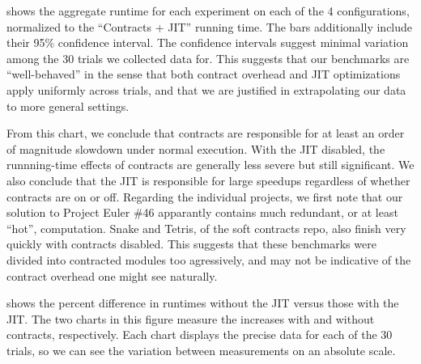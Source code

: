 


 shows the aggregate runtime for each experiment on each of the 4 configurations, normalized to the ``Contracts + JIT'' running time.
The bars additionally include their 95\% confidence interval.
The confidence intervals suggest minimal variation among the 30 trials we collected data for.
This suggests that our benchmarks are ``well-behaved'' in the sense that both contract overhead and JIT optimizations apply uniformly across trials, and that we are justified in extrapolating our data to more general settings.

From this chart, we conclude that contracts are responsible for at least an order of magnitude slowdown under normal execution.
With the JIT disabled, the runnning-time effects of contracts are generally less severe but still significant.
We also conclude that the JIT is responsible for large speedups regardless of whether contracts are on or off.
Regarding the individual projects, we first note that our solution to Project Euler \#46 apparantly contains much redundant, or at least ``hot'', computation.
Snake and Tetris, of the soft contracts repo, also finish very quickly with contracts disabled.
This suggests that these benchmarks were divided into contracted modules too agressively, and may not be indicative of the contract overhead one might see naturally.

 shows the percent difference in runtimes without the JIT versus those with the JIT.
The two charts in this figure measure the increases with and without contracts, respectively.
Each chart displays the precise data for each of the 30 trials, so we can see the variation between measurements on an absolute scale.


